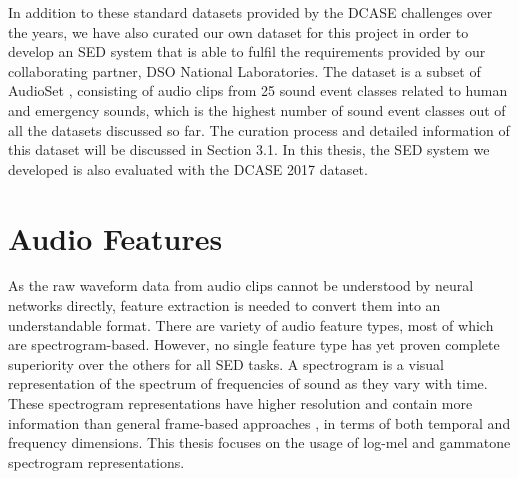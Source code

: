 
In addition to these standard datasets provided by the DCASE challenges over the years, we have also curated our own dataset for this project in order to develop an SED system that is able to fulfil the requirements provided by our collaborating partner, DSO National Laboratories. The dataset is a subset of AudioSet \cite{audioset}, consisting of audio clips from 25 sound event classes related to human and emergency sounds, which is the highest number of sound event classes out of all the datasets discussed so far. The curation process and detailed information of this dataset will be discussed in Section 3.1. In this thesis, the SED system we developed is also evaluated with the DCASE 2017 dataset.


\section{Audio Features}
As the raw waveform data from audio clips cannot be understood by neural networks directly, feature extraction is needed to convert them into an understandable format. There are variety of audio feature types, most of which are spectrogram-based. However, no single feature type has yet proven complete superiority over the others for all SED tasks. A  spectrogram  is  a  visual  representation  of  the  spectrum  of  frequencies  of sound as they vary with time. These spectrogram representations have higher resolution and contain more information than general frame-based approaches \cite{spec-2019}, in terms of both temporal and frequency dimensions. This thesis focuses on the usage of log-mel and gammatone spectrogram representations. 

